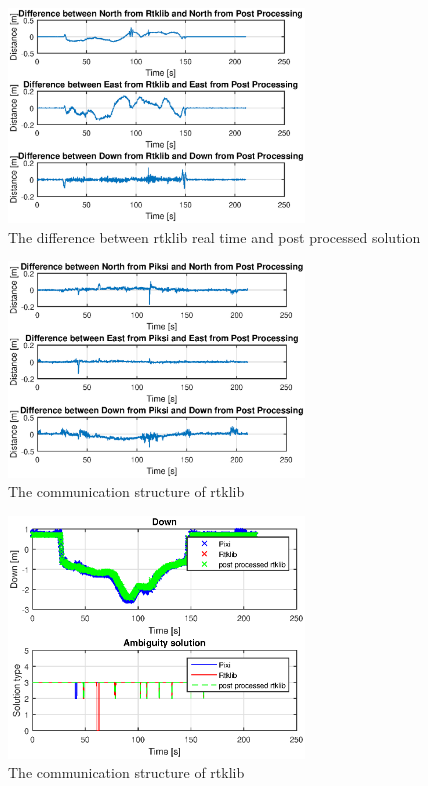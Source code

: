 \begin{figure}[H]
	\centering
		\includegraphics[width=0.7\textwidth]{figs/plots/ertkpost.eps}
		\caption{The difference between rtklib real time and post processed solution}
		\label{figure:RTKLIB_STRUCTURE}
\end{figure}
\begin{figure}[H]
	\centering
		\includegraphics[width=0.7\textwidth]{figs/plots/epiksiport.eps}
		\caption{The communication structure of rtklib}
		\label{figure:RTKLIB_STRUCTURE}
\end{figure}
\begin{figure}[H]
	\centering
		\includegraphics[width=0.7\textwidth]{figs/plots/down.eps}
		\caption{The communication structure of rtklib}
		\label{figure:RTKLIB_STRUCTURE}
\end{figure}
\cleardoublepage
